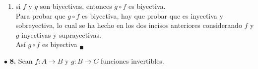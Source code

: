 \documentclass[12pt]{article}
\begin{document}
\begin{enumerate}[label=\alph*)]
    \item si ${\displaystyle f}$ y ${\displaystyle g}$ son biyectivas, entonces ${\displaystyle g \circ f}$ es biyectiva.\\

    Para probar que $g \circ f$ es biyectiva, hay que probar que es inyectiva y sobreyectiva, lo cual se ha hecho en los dos incisos anteriores 
    considerando $f$ y $g$ inyectivas y suprayectivas.\\

    Así $g \circ f$ es biyectiva $_\blacksquare$
\end{enumerate}

\vspace{0.5cm}
%
%
$\bullet$ \textbf{8.} Sean ${\displaystyle f: A \longrightarrow B}$ y ${\displaystyle g: B \longrightarrow C}$ funciones invertibles.
\end{document}
